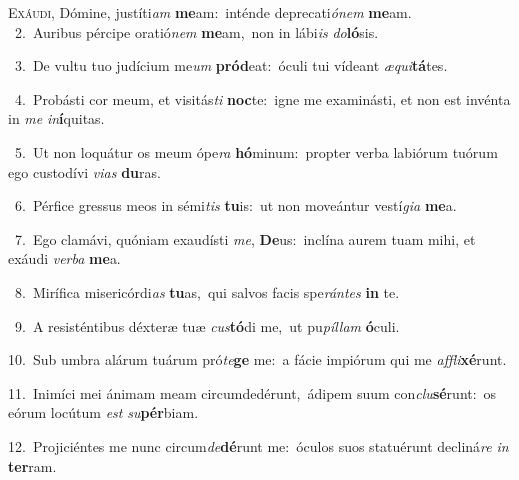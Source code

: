 \lettrine{\initial\textcolor{\initialcolor}{E}}{xáudi,} Dómine, justíti\textit{am} \textbf{me}\-am:~\star inténde deprecati\-\textit{ó}\-\textit{nem} \textbf{me}\-am.\\
{\numbfont\textcolor{\numbcolor}{~2.}}~Auribus pércipe oratió\textit{nem} \textbf{me}\-am,~\star non in lábi\textit{is} \textit{do}\-\textbf{ló}sis.\par
{\numbfont\textcolor{\numbcolor}{~3.}}~De vultu tuo judícium me\textit{um} \textbf{pród}\-eat:~\star óculi tui vídeant \textit{æ}\-\textit{qui}\textbf{tá}tes.\par
{\numbfont\textcolor{\numbcolor}{~4.}}~Probásti cor meum, et visitás\textit{ti} \textbf{noc}\-te:~\star igne me examinásti, et non est invénta in \textit{me} \textit{in}\-\textbf{í}quitas.\par
{\numbfont\textcolor{\numbcolor}{~5.}}~Ut non loquátur os meum ópe\textit{ra} \textbf{hó}\-minum:~\star propter verba labiórum tuórum ego custodívi \textit{vi}\-\textit{as} \textbf{du}\-ras.\par
{\numbfont\textcolor{\numbcolor}{~6.}}~Pérfice gressus meos in sémi\textit{tis} \textbf{tu}\-is:~\star ut non moveántur vestí\-\textit{gi}\-\textit{a} \textbf{me}\-a.\par
{\numbfont\textcolor{\numbcolor}{~7.}}~Ego clamávi, quóniam exaudísti \textit{me}\-, \textbf{De}\-us:~\star inclína aurem tuam mihi, et exáudi \textit{ver}\-\textit{ba} \textbf{me}\-a.\par
{\numbfont\textcolor{\numbcolor}{~8.}}~Mirífica misericórdi\textit{as} \textbf{tu}\-as,~\star qui salvos facis spe\-\textit{rán}\-\textit{tes} \textbf{in} te.\par
{\numbfont\textcolor{\numbcolor}{~9.}}~A resisténtibus déxteræ tuæ \textit{cus}\-\textbf{tó}di me,~\star ut pu\-\textit{píl}\-\textit{lam} \textbf{ó}\-culi.\par
{\numbfont\textcolor{\numbcolor}{10.}}~Sub umbra alárum tuárum pró\-\textit{te}\-\textbf{ge} me:~\star a fácie impiórum qui me \textit{af}\-\textit{fli}\textbf{xé}runt.\par
{\numbfont\textcolor{\numbcolor}{11.}}~Inimíci mei ánimam meam circumdedérunt,~\dagger ádipem suum con\-\textit{clu}\-\textbf{sé}runt:~\star os eórum locútum \textit{est} \textit{su}\-\textbf{pér}biam.\par
{\numbfont\textcolor{\numbcolor}{12.}}~Projiciéntes me nunc circum\-\textit{de}\-\textbf{dé}runt me:~\star óculos suos statuérunt decliná\textit{re} \textit{in} \textbf{ter}\-ram.\par
